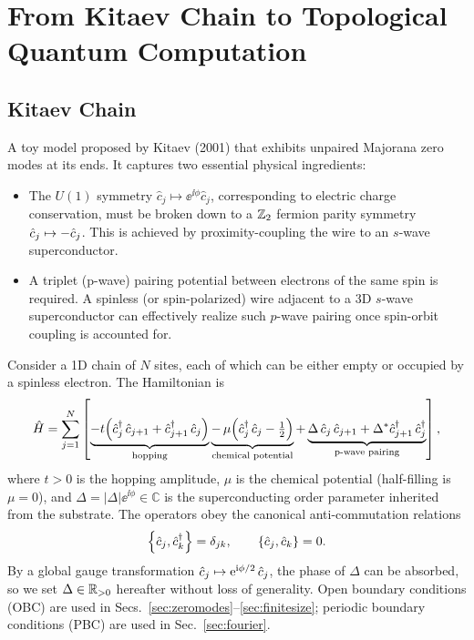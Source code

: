 \chapter{From Kitaev Chain to Topological Quantum Computation}

\section{Kitaev Chain}

A toy model proposed by Kitaev (2001) that exhibits unpaired Majorana zero modes at its ends. It captures two essential physical ingredients:
\begin{itemize}
    \item The $U(1)$ symmetry $\hat{c}_j \mapsto \ee^{\ii \phi} \hat{c}_j$, corresponding to electric charge conservation, must be broken down to a $\mathbb{Z}_2$ fermion parity symmetry $\hat{c}_j \mapsto -\hat{c}_j$. This is achieved by proximity-coupling the wire to an $s$-wave superconductor.
    \item A triplet (p-wave) pairing potential between electrons of the same spin is required. A spinless (or spin-polarized) wire adjacent to a 3D $s$-wave superconductor can effectively realize such $p$-wave pairing once spin-orbit coupling is accounted for.
\end{itemize}

Consider a 1D chain of $N$ sites, each of which can be either empty or occupied by a spinless electron. The Hamiltonian is
\begin{align}
    \hat{H} = \sum_{j=1}^{N} \left[ \underbrace{-t\!\left(\hat{c}^{\dag}_{j}\,\hat{c}_{j+1} + \hat{c}^{\dag}_{j+1}\,\hat{c}_{j}\right)}_{\text{hopping}} \underbrace{-\, \mu \!\left(\hat{c}^{\dag}_{j}\,\hat{c}_{j} - \tfrac{1}{2}\right)}_{\text{chemical potential}} + \underbrace{\Delta\,\hat{c}_{j}\,\hat{c}_{j+1} + \Delta^{*}\hat{c}^{\dag}_{j+1}\,\hat{c}^{\dag}_{j}}_{\text{p-wave pairing}} \right],
    \label{eq:kitaev_H}
\end{align}
where $t > 0$ is the hopping amplitude, $\mu$ is the chemical potential (half-filling is $\mu = 0$), and $\Delta = |\Delta|\ee^{\ii\phi} \in \mathbb{C}$ is the superconducting order parameter inherited from the substrate. The operators obey the canonical anti-commutation relations
\begin{align}
    \left\{ \hat{c}_j , \hat{c}_k^{\dag} \right\} = \delta_{jk}, \qquad \left\{ \hat{c}_j , \hat{c}_k \right\} = 0.
\end{align}
By a global gauge transformation $\hat{c}_j \mapsto \mathrm{e}^{\mathrm{i}\phi/2}\,\hat{c}_j$, the phase of $\Delta$ can be absorbed, so we set $\Delta \in \mathbb{R}_{>0}$ hereafter without loss of generality. Open boundary conditions (OBC) are used in Secs.~\ref{sec:zeromodes}--\ref{sec:finitesize}; periodic boundary conditions (PBC) are used in Sec.~\ref{sec:fourier}.

